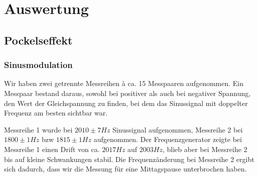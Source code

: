 \section{Auswertung}

\subsection{Pockelseffekt}

\subsubsection{Sinusmodulation}

Wir haben zwei getrennte Messreihen à ca. 15 Messpaaren aufgenommen. Ein Messpaar bestand daraus, sowohl bei positiver als auch bei negativer Spannung, den Wert der Gleichspannung zu finden, bei dem das Sinussignal mit doppelter Frequenz am besten sichtbar war.

Messreihe 1 wurde bei $2010 \pm 7 Hz$ Sinussignal aufgenommen, Messreihe 2 bei $1800 \pm 1 Hz$ bzw $1815 \pm 1 Hz$ aufgenommen. Der Frequenzgenerator zeigte bei Messreihe 1 einen Drift von ca. $2017 Hz$ auf $2003 Hz$, blieb aber bei Messreihe 2 bis auf kleine Schwankungen stabil. Die Frequenzänderung bei Messreihe 2 ergibt sich dadurch, dass wir die Messung für eine Mittagspause unterbrochen haben.


